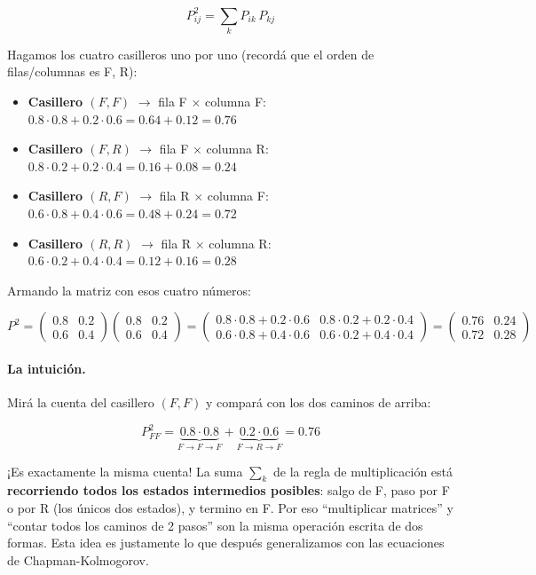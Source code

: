 \documentclass[a4paper,11pt]{article}
\begin{document}
\[P^2_{ij} = \sum_{k} P_{ik}\, P_{kj}\]

Hagamos los cuatro casilleros uno por uno (recordá que el orden de filas/columnas es F, R):

\begin{itemize}
    \item \textbf{Casillero $(F,F)$} $\rightarrow$ fila F $\times$ columna F:\quad $0.8 \cdot 0.8 + 0.2 \cdot 0.6 = 0.64 + 0.12 = 0.76$
    \item \textbf{Casillero $(F,R)$} $\rightarrow$ fila F $\times$ columna R:\quad $0.8 \cdot 0.2 + 0.2 \cdot 0.4 = 0.16 + 0.08 = 0.24$
    \item \textbf{Casillero $(R,F)$} $\rightarrow$ fila R $\times$ columna F:\quad $0.6 \cdot 0.8 + 0.4 \cdot 0.6 = 0.48 + 0.24 = 0.72$
    \item \textbf{Casillero $(R,R)$} $\rightarrow$ fila R $\times$ columna R:\quad $0.6 \cdot 0.2 + 0.4 \cdot 0.4 = 0.12 + 0.16 = 0.28$
\end{itemize}

Armando la matriz con esos cuatro números:

\[P^2 = \begin{pmatrix}
0.8 & 0.2 \\
0.6 & 0.4
\end{pmatrix} \begin{pmatrix}
0.8 & 0.2 \\
0.6 & 0.4
\end{pmatrix} = \begin{pmatrix}
0.8 \cdot 0.8 + 0.2 \cdot 0.6 & 0.8 \cdot 0.2 + 0.2 \cdot 0.4 \\
0.6 \cdot 0.8 + 0.4 \cdot 0.6 & 0.6 \cdot 0.2 + 0.4 \cdot 0.4
\end{pmatrix} = \begin{pmatrix}
0.76 & 0.24 \\
0.72 & 0.28
\end{pmatrix}\]

\paragraph{La intuición.} Mirá la cuenta del casillero $(F,F)$ y compará con los dos caminos de arriba:

\[P^2_{FF} = \underbrace{0.8 \cdot 0.8}_{F\to F\to F} + \underbrace{0.2 \cdot 0.6}_{F\to R\to F} = 0.76\]

¡Es exactamente la misma cuenta! La suma $\sum_k$ de la regla de multiplicación está \textbf{recorriendo todos los estados intermedios posibles}: salgo de F, paso por F o por R (los únicos dos estados), y termino en F. Por eso ``multiplicar matrices'' y ``contar todos los caminos de 2 pasos'' son la misma operación escrita de dos formas. Esta idea es justamente lo que después generalizamos con las ecuaciones de Chapman-Kolmogorov.
\end{document}
